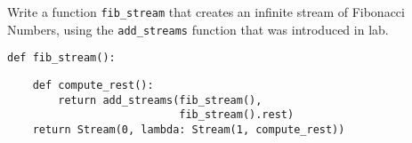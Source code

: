 \question Write a function \texttt{fib\_stream} that creates an infinite
stream of Fibonacci Numbers, using the \texttt{add\_streams} function that was
introduced in lab.

\begin{lstlisting}
def fib_stream():
\end{lstlisting}
\begin{solution}[4cm]
\begin{lstlisting}
    def compute_rest():
        return add_streams(fib_stream(),
                           fib_stream().rest)
    return Stream(0, lambda: Stream(1, compute_rest))
\end{lstlisting}
\end{solution}
